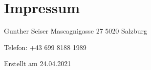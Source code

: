 \documentclass[letterpaper,10pt,ngerman]{sphinxmanual}
\begin{document}
\chapter{Impressum}
\label{\detokenize{impressum:impressum}}\label{\detokenize{impressum::doc}}
Gunther Seiser
Mascagnigasse 27
5020 Salzburg

Telefon: +43 699 8188 1989


Erstellt  am 24.04.2021



\renewcommand{\indexname}{Stichwortverzeichnis}
\printindex
\end{document}
